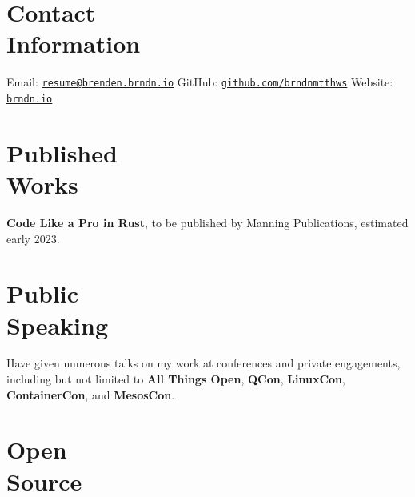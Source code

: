 \documentclass[margin,line]{resume}
\begin{document}
 
\begin{resume}

    \section{\mysidestyle Contact\\Information}

    Email: \href{mailto:resume@brenden.brndn.io}{\texttt{resume@brenden.brndn.io}} \hfill
    GitHub: \href{https://github.com/brndnmtthws}{\texttt{github.com/brndnmtthws}} \hfill
    Website: \href{https://brndn.io}{\texttt{brndn.io}} \hfill
    \vspace{3mm}

    \section{\mysidestyle Published\\Works}

    \textbf{Code Like a Pro in Rust}, to be published by Manning Publications,
    estimated early 2023.

    \vspace{3mm}

    \section{\mysidestyle Public\\Speaking}

    Have given numerous talks on my work at conferences and private engagements,
    including but not limited to \textbf{All Things Open}, \textbf{QCon},
    \textbf{LinuxCon}, \textbf{ContainerCon}, and \textbf{MesosCon}.
    
    \vspace{3mm}

    \section{\mysidestyle Open\\Source}


\end{resume}
\end{document}

